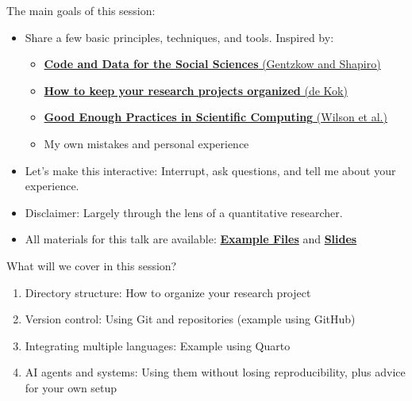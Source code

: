 \documentclass[
  ignorenonframetext,
  aspectratio=169,
]{beamer}
\providecommand{\tightlist}{%
  \setlength{\itemsep}{0pt}\setlength{\parskip}{0pt}}
\begin{document}
\begin{frame}{The main goals of this session:}
\label{the-main-goals-of-this-session}
\begin{itemize}
\tightlist
\item
  Share a few basic principles, techniques, and tools. Inspired by:

  \begin{itemize}
  \tightlist
  \item
    \href{https://web.stanford.edu/~gentzkow/research/CodeAndData.pdf}{\textbf{Code
    and Data for the Social Sciences} (Gentzkow and Shapiro)}
  \item
    \href{https://medium.com/data-science/how-to-keep-your-research-projects-organized-part-1-folder-structure-10bd56034d3a}{\textbf{How
    to keep your research projects organized} (de Kok)}
  \item
    \href{https://journals.plos.org/ploscompbiol/article?id=10.1371/journal.pcbi.1005510}{\textbf{Good
    Enough Practices in Scientific Computing} (Wilson et al.)}
  \item
    My own mistakes and personal experience
  \end{itemize}
\item
  Let's make this interactive: Interrupt, ask questions, and tell me
  about your experience.
\item
  Disclaimer: Largely through the lens of a quantitative researcher.
\item
  All materials for this talk are available:
  \href{https://github.com/victorvanpelt/research_pipeline_example}{\textbf{Example
  Files}} and
  \href{https://github.com/victorvanpelt/research_pipeline_slidedeck}{\textbf{Slides}}
\end{itemize}
\end{frame}

\begin{frame}{What will we cover in this session?}
\label{what-will-we-cover-in-this-session}
\begin{enumerate}
\item
  Directory structure: How to organize your research project
\item
  Version control: Using Git and repositories (example using GitHub)
\item
  Integrating multiple languages: Example using Quarto
\item
  AI agents and systems: Using them without losing reproducibility, plus
  advice for your own setup
\end{enumerate}
\end{frame}
\end{document}

